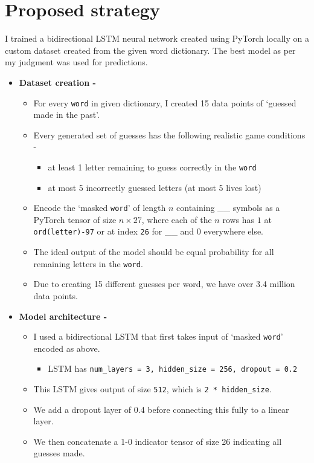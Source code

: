 \documentclass{article}
\begin{document}
\section{Proposed strategy}
I trained a bidirectional LSTM neural network created using PyTorch locally on a custom dataset created from the given word dictionary. The best model as per my judgment was used for predictions. 
\begin{itemize}
	\item \textbf{Dataset creation -} 
	\begin{itemize}
		\item For every \texttt{word} in given dictionary, I created 15 data points of `guessed made in the past'.
		\item Every generated set of guesses has the following realistic game conditions -
		\begin{itemize}
			\item at least 1 letter remaining to guess correctly in the \texttt{word}
			\item at most 5 incorrectly guessed letters (at most 5 lives lost)
		\end{itemize}
		\item Encode the `masked \texttt{word}' of length $n$ containing \_\_ symbols as a PyTorch tensor of size $n\times 27$, where each of the $n$ rows has $1$ at \texttt{ord(letter)-97} or at index \texttt{26} for \_\_ and $0$ everywhere else.
		\item The ideal output of the model should be equal probability for all remaining letters in the \texttt{word}. 
		\item Due to creating 15 different guesses per word, we have over 3.4 million data points. 
	\end{itemize}
	\item \textbf{Model architecture -}
	\begin{itemize}
		\item I used a bidirectional LSTM that first takes input of `masked \texttt{word}' encoded as above.
		\begin{itemize}
			\item LSTM has \texttt{num\_layers = 3, hidden\_size = 256, dropout = 0.2}
		\end{itemize}
		\item This LSTM gives output of size \texttt{512}, which is \texttt{2 * hidden\_size}.
		\item We add a dropout layer of 0.4 before connecting this fully to a linear layer. 
		\item We then concatenate a 1-0 indicator tensor of size 26 indicating all guesses made.

\end{itemize}
\end{itemize}
\end{document}
